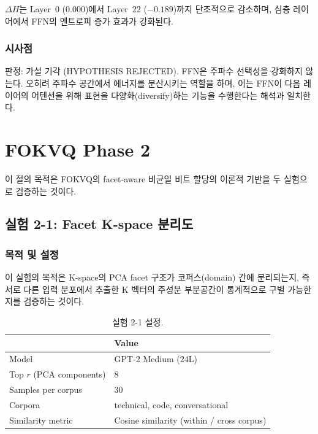 \documentclass[11pt,a4paper]{article}
\begin{document}
$\Delta H$는 Layer~0 (0.000)에서 Layer~22 ($-0.189$)까지 단조적으로 감소하며, 심층 레이어에서 FFN의 엔트로피 증가 효과가 강화된다.

\subsubsection{시사점}

판정: \textcolor{failure}{가설 기각 (HYPOTHESIS REJECTED)}.
FFN은 주파수 선택성을 강화하지 않는다.
오히려 주파수 공간에서 에너지를 분산시키는 역할을 하며, 이는 FFN이 다음 레이어의 어텐션을 위해 표현을 다양화(diversify)하는 기능을 수행한다는 해석과 일치한다.

\section{FOKVQ Phase 2}

이 절의 목적은 FOKVQ의 facet-aware 비균일 비트 할당의 이론적 기반을 두 실험으로 검증하는 것이다.

\subsection{실험 2-1: Facet K-space 분리도}

\subsubsection{목적 및 설정}

이 실험의 목적은 K-space의 PCA facet 구조가 코퍼스(domain) 간에 분리되는지, 즉 서로 다른 입력 분포에서 추출한 K 벡터의 주성분 부분공간이 통계적으로 구별 가능한지를 검증하는 것이다.

\begin{table}[H]
\centering
\caption{실험 2-1 설정.}
\label{tab:exp21_setup}
\begin{tabular}{ll}
\toprule
\textbf{} & \textbf{Value} \\
\midrule
Model & GPT-2 Medium (24L) \\
Top $r$ (PCA components) & 8 \\
Samples per corpus & 30 \\
Corpora & technical, code, conversational \\
Similarity metric & Cosine similarity (within / cross corpus) \\
\bottomrule
\end{tabular}
\end{table}
\end{document}
